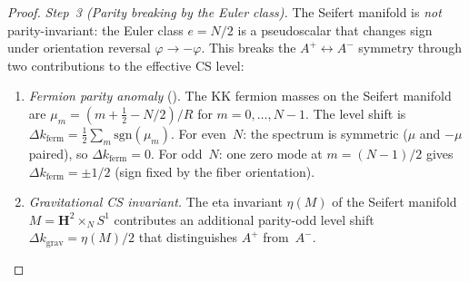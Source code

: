\begin{proof}
\emph{Step~3 (Parity breaking by the Euler class).}
The Seifert manifold is \emph{not} parity-invariant:
the Euler class $e = N/2$ is a pseudoscalar that changes sign
under orientation reversal $\varphi \to -\varphi$.
This breaks the $A^+ \leftrightarrow A^-$ symmetry through
two contributions to the effective CS level:
\begin{enumerate}
\item \emph{Fermion parity anomaly} (\citealt{Redlich1984}).
  The KK fermion masses on the Seifert manifold are
  $\mu_m = (m + \tfrac{1}{2} - N/2)/R$ for $m = 0,\ldots,N{-}1$.
  The level shift is
  $\Delta k_{\mathrm{ferm}} = \tfrac{1}{2}\sum_m \mathrm{sgn}(\mu_m)$.
  For even~$N$: the spectrum is symmetric ($\mu$ and $-\mu$
  paired), so $\Delta k_{\mathrm{ferm}} = 0$.
  For odd~$N$: one zero mode at $m = (N{-}1)/2$ gives
  $\Delta k_{\mathrm{ferm}} = \pm 1/2$
  (sign fixed by the fiber orientation).
\item \emph{Gravitational CS invariant.}
  The eta invariant $\eta(M)$ of the Seifert manifold
  $M = \mathbf{H}^2 \times_N S^1$ contributes an additional
  parity-odd level shift
  $\Delta k_{\mathrm{grav}} = \eta(M)/2$
  that distinguishes $A^+$ from~$A^-$.


\end{enumerate}
\end{proof}
